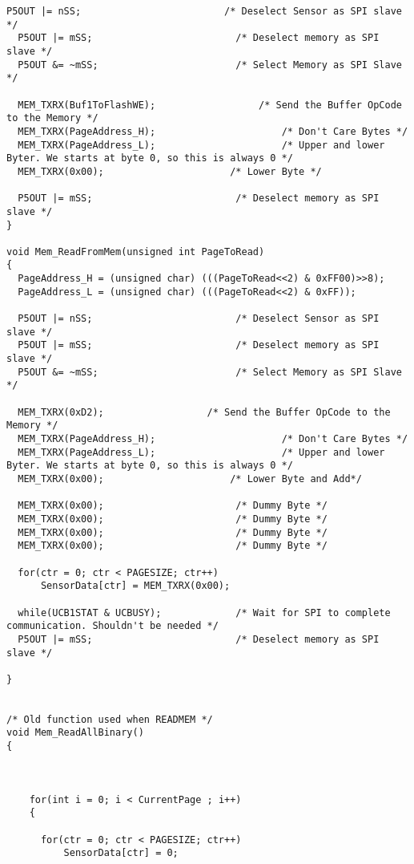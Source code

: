 \begin{lstlisting}[caption=Main.c,label=Code4]
  P5OUT |= nSS;                         /* Deselect Sensor as SPI slave */ 
  P5OUT |= mSS;                         /* Deselect memory as SPI slave */ 
  P5OUT &= ~mSS;                        /* Select Memory as SPI Slave */
  
  MEM_TXRX(Buf1ToFlashWE);                  /* Send the Buffer OpCode to the Memory */
  MEM_TXRX(PageAddress_H);                      /* Don't Care Bytes */
  MEM_TXRX(PageAddress_L);                      /* Upper and lower Byter. We starts at byte 0, so this is always 0 */
  MEM_TXRX(0x00);                      /* Lower Byte */
  
  P5OUT |= mSS;                         /* Deselect memory as SPI slave */ 
}

void Mem_ReadFromMem(unsigned int PageToRead)
{
  PageAddress_H = (unsigned char) (((PageToRead<<2) & 0xFF00)>>8);
  PageAddress_L = (unsigned char) (((PageToRead<<2) & 0xFF));
  
  P5OUT |= nSS;                         /* Deselect Sensor as SPI slave */ 
  P5OUT |= mSS;                         /* Deselect memory as SPI slave */ 
  P5OUT &= ~mSS;                        /* Select Memory as SPI Slave */
  
  MEM_TXRX(0xD2);                  /* Send the Buffer OpCode to the Memory */
  MEM_TXRX(PageAddress_H);                      /* Don't Care Bytes */
  MEM_TXRX(PageAddress_L);                      /* Upper and lower Byter. We starts at byte 0, so this is always 0 */
  MEM_TXRX(0x00);                      /* Lower Byte and Add*/

  MEM_TXRX(0x00);                       /* Dummy Byte */
  MEM_TXRX(0x00);                       /* Dummy Byte */
  MEM_TXRX(0x00);                       /* Dummy Byte */
  MEM_TXRX(0x00);                       /* Dummy Byte */
  
  for(ctr = 0; ctr < PAGESIZE; ctr++)
      SensorData[ctr] = MEM_TXRX(0x00);
  
  while(UCB1STAT & UCBUSY);             /* Wait for SPI to complete communication. Shouldn't be needed */
  P5OUT |= mSS;                         /* Deselect memory as SPI slave */ 
  
}


/* Old function used when READMEM */
void Mem_ReadAllBinary()
{

    
    
    for(int i = 0; i < CurrentPage ; i++)
    {
      
      for(ctr = 0; ctr < PAGESIZE; ctr++)
          SensorData[ctr] = 0;
      

\end{lstlisting}
